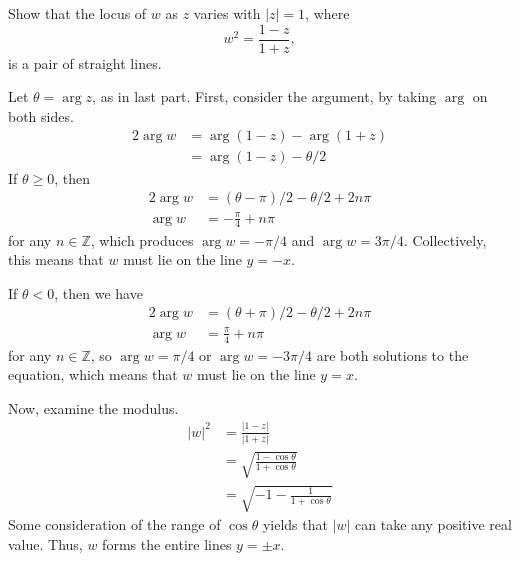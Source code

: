 \documentclass[12pt]{article}
\begin{document}
    \begin{subquestion}
        Show that the locus of $w$ as $z$ varies with $|z|=1$, where
        \[
        w^{2} = \frac{1-z}{1+z},
        \]
        is a pair of straight lines.
    \end{subquestion}
    \begin{answer}
        Let $\theta = \arg z$, as in last part.
        First, consider the argument, by taking $\arg$ on both sides.
        \begin{align*}
            2\arg w
            &= \arg(1-z) - \arg(1+z)\\
            &= \arg(1-z) - \theta/2
        \end{align*}
        If $\theta \ge 0$, then
        \begin{align*}
            2\arg w
            &= (\theta-\pi)/2 - \theta/2 + 2n\pi\\
            \arg w
            &= -\frac{\pi}{4} + n\pi
        \end{align*}
        for any $n \in \mathbb{Z}$, which produces $\arg w = -\pi/4$ and $\arg w = 3\pi/4$.
        Collectively, this means that $w$ must lie on the line $y = -x$.

        If $\theta < 0$, then we have
        \begin{align*}
            2\arg w
            &= (\theta+\pi)/2 - \theta/2 + 2n\pi\\
            \arg w
            &= \frac{\pi}{4} + n\pi
        \end{align*}
        for any $n \in \mathbb{Z}$, so $\arg w = \pi/4$ or $\arg w = -3\pi/4$
        are both solutions to the equation,
        which means that $w$ must lie on the line $y = x$.

        Now, examine the modulus.
        \begin{align*}
            |w|^{2} 
            &= \frac{|1-z|}{|1+z|}\\
            &= \sqrt{\frac{1-\cos\theta}{1+\cos\theta}}\\
            &= \sqrt{-1-\frac{1}{1+\cos\theta}}
        \end{align*}
        Some consideration of the range of $\cos\theta$ yields that
        $|w|$ can take any positive real value. Thus,
        $w$ forms the entire lines $y=\pm x$.
    \end{answer}
\end{document}
